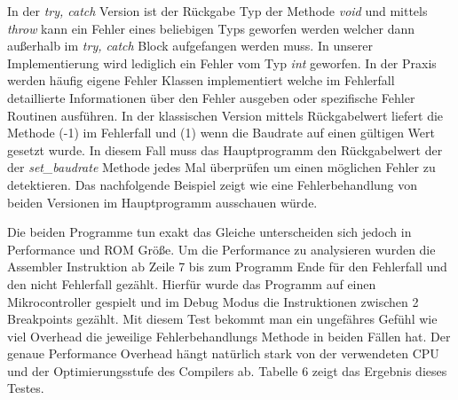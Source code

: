 \documentclass[MES,Master,ngerman]{twbook}%
\begin{document}
 In der \textit{try, catch} Version ist der Rückgabe Typ der Methode \textit{void} und mittels \textit{throw} kann ein Fehler eines beliebigen Typs geworfen werden welcher dann außerhalb im \textit{try, catch} Block aufgefangen werden muss. In unserer Implementierung wird lediglich ein Fehler vom Typ \textit{int} geworfen. In der Praxis werden häufig eigene Fehler Klassen implementiert welche im Fehlerfall detaillierte Informationen über den Fehler ausgeben oder spezifische Fehler Routinen ausführen. In der klassischen Version mittels Rückgabelwert liefert die Methode (-1) im Fehlerfall und (1) wenn die Baudrate auf einen gültigen Wert gesetzt wurde. In diesem Fall muss das Hauptprogramm den Rückgabelwert der der \textit{set\_baudrate} Methode jedes Mal überprüfen um einen möglichen Fehler zu detektieren. Das nachfolgende Beispiel zeigt wie eine Fehlerbehandlung von beiden Versionen im Hauptprogramm ausschauen würde. \newpage
 
 \begin{figure}[!htb]
 	\begin{subfigure}[b]{0.5\textwidth}
 		
 		\label{fig:40}
 	\end{subfigure}
 	\begin{subfigure}[b]{0.5\textwidth}
 		
 		\label{fig:41}
 	\end{subfigure}
 \end{figure}

Die beiden Programme tun exakt das Gleiche unterscheiden sich jedoch in Performance und ROM Größe. Um die Performance zu analysieren wurden die Assembler Instruktion ab Zeile 7 bis zum Programm Ende für den Fehlerfall und den nicht Fehlerfall gezählt. Hierfür wurde das Programm auf einen Mikrocontroller gespielt und im Debug Modus die Instruktionen zwischen 2 Breakpoints gezählt. Mit diesem Test bekommt man ein ungefähres Gefühl wie viel Overhead die jeweilige Fehlerbehandlungs Methode in beiden Fällen hat. Der genaue Performance Overhead hängt natürlich stark von der verwendeten CPU und der Optimierungsstufe des Compilers ab. Tabelle 6 zeigt das Ergebnis dieses Testes.
\end{document}
